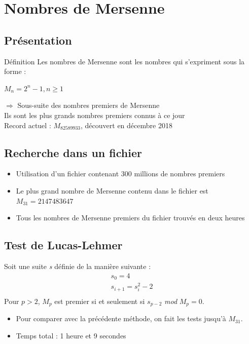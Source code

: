 \documentclass{beamer}
\begin{document}
\section{Nombres de Mersenne}
\subsection*{Présentation}
\begin{frame}
\begin{block}{Définition}
Les nombres de Mersenne sont les nombres qui s'expriment sous la forme :
\begin{center}
$M_{n} = 2^{n}-1, n\geq1$
\end{center}
\end{block}
$\Rightarrow$ Sous-suite des nombres premiers de Mersenne\\
\vspace{0.25cm}
Ils sont les plus grands nombres premiers connus à ce jour\\
\vspace{0.25cm}
Record actuel : $M_{82 589 933}$, découvert en décembre 2018
\end{frame}

\subsection{Recherche dans un fichier}
\begin{frame}
\begin{itemize}
\item Utilisation d'un fichier contenant 300 millions de nombres premiers
\item Le plus grand nombre de Mersenne contenu dans le fichier est $M_{31}=2 147 483 647$
\item Tous les nombres de Mersenne premiers du fichier trouvés en deux heures
\end{itemize}
\end{frame}

\subsection{Test de Lucas-Lehmer}
\begin{frame}
Soit une suite \textit{s} définie de la manière suivante :
$$
    \begin{array}{ll}
        s_{0} = 4 \\
        s_{i+1} = s_{i}^{2}-2 \\
    \end{array}
$$
Pour $p>2$, $M_{p}$ est premier si et seulement si $s_{p-2}$ \textit{mod} $M_{p} = 0$.\\
\begin{itemize}
\item Pour comparer avec la précédente méthode, on fait les tests jusqu'à $M_{31}$.\\
\item Temps total : 1 heure et 9 secondes
\end{itemize}
\end{frame}
\end{document}

